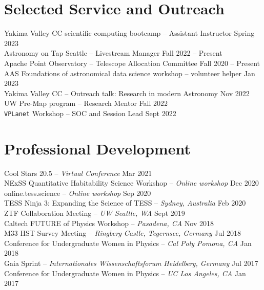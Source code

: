 \documentclass[a4,10.5pt]{article}
\begin{document}
\section{Selected Service and Outreach}

Yakima Valley CC scientific computing bootcamp -- Assistant Instructor \hfill Spring 2023 \\
Astronomy on Tap Seattle -- Livestream Manager \hfill Fall 2022 -- Present \\
Apache Point Observatory -- Telescope Allocation Committee \hfill Fall 2020 -- Present \\
AAS Foundations of astronomical data science workshop -- volunteer helper \hfill Jan 2023 \\
Yakima Valley CC -- Outreach talk: Research in modern Astronomy \hfill Nov 2022 \\
UW Pre-Map program -- Research Mentor \hfill Fall 2022 \\
\texttt{VPLanet} Workshop -- SOC and Session Lead \hfill Sept 2022 

\section{Professional Development}

Cool Stars 20.5 -- \textit{Virtual Conference} \hfill Mar 2021 \\
NExSS Quantitative Habitability Science Workshop -- \textit{Online workshop} \hfill Dec 2020 \\
online.tess.science -- \textit{Online workshop} \hfill Sep 2020 \\
TESS Ninja 3: Expanding the Science of TESS -- \textit{Sydney, Australia} \hfill Feb 2020 \\
ZTF Collaboration Meeting -- \textit{UW Seattle, WA} \hfill Sept 2019 \\
Caltech FUTURE of Physics Workshop -- \textit{Pasadena, CA} \hfill Nov 2018 \\
M33 HST Survey Meeting -- \textit{Ringberg Castle, Tegernsee, Germany} \hfill Jul 2018 \\
Conference for Undergraduate Women in Physics -- \textit{Cal Poly Pomona, CA}  \hfill Jan 2018 \\
Gaia Sprint -- \textit{Internationales Wissenschaftsforum Heidelberg, Germany}  \hfill Jul 2017 \\
Conference for Undergraduate Women in Physics -- \textit{UC Los Angeles, CA}  \hfill Jan 2017 
\end{document}
